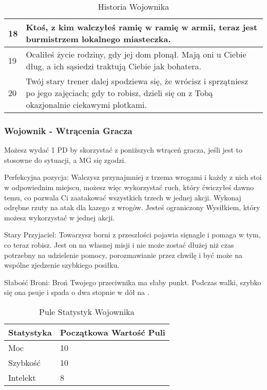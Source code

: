 \begin{table*}[t]
\begin{tabularx}{\textwidth}{| p{} | X |}
    18 & Ktoś, z kim walczyłeś ramię w ramię w armii, teraz jest burmistrzem lokalnego miasteczka. \\ \hline
    19 & Ocaliłeś życie rodziny, gdy jej dom płonął. Mają oni u Ciebie dług, a ich sąsiedzi traktują Ciebie jak bohatera. \\ \hline
    20 & Twój stary trener dalej spodziewa się, że wrócisz i sprzątniesz po jego zajęciach; gdy to robisz, dzieli się on z Tobą okazjonalnie ciekawymi plotkami. \\ \hline
 \end{tabularx}
  \caption {Historia Wojownika}
  \label {Historia Wojownika}
 \end{table*}
 
\subsubsection{Wojownik - Wtrącenia Gracza}

Możesz wydać 1 PD by skorzystać z poniższych wtrąceń gracza, jeśli jest to stosowne do sytuacji, a MG się zgodzi.

Perfekcyjna pozycja: Walczysz przynajmniej z trzema wrogami i każdy z nich stoi w odpowiednim miejscu, możesz więc wykorzystać ruch, który ćwiczyłeś dawno temu, co pozwala Ci zaatakować wszystkich trzech w jednej akcji. Wykonaj odrębne rzuty na atak dla kazego z wrogów. Jesteś ograniczony Wysiłkiem, który możesz wykorzystać w jednej akcji.

Stary Przyjaciel: Towarzysz borni z przeszłości pojawia sięnagle i pomaga w tym, co teraz robisz. Jest on na własnej misji i nie może zostać dłużej niż czas potrzebny na udzielenie pomocy, porozmawianie przez chwilę i być może na wspólne zjedzenie szybkiego posiłku.

Słabość Broni: Broń Twojego przeciwnika ma słaby punkt. Podczas walki, szybko się ona psuje i spada o dwa stopnie w dół na .

\begin{table*}[t]
 \centering
 \begin{tabularx}{\textwidth}{ | X | X |}
  \hline
   \textbf{Statystyka} & \textbf{Początkowa Wartość Puli}  \\ \hline
    Moc & 10  \\ \hline
    Szybkość & 10  \\ \hline
    Intelekt & 8  \\ \hline
 \end{tabularx}
  \caption {Pule Statystyk Wojownika}
  \label {Pule Statystyk Wojownika}
 \end{table*}
 
